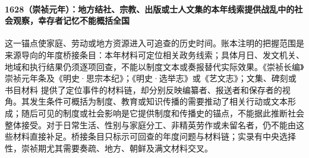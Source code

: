 \paragraph{1628（崇祯元年）：地方结社、宗教、出版或士人文集的本年线索提供战乱中的社会观察，幸存者记忆不能概括全国} 这一锚点使家庭、劳动或地方资源进入可追查的历史时间。账本注明的把握范围是来源导向的年度桥接条目：本年材料可定位相关政务线索；具体月日、发文机关、地域和执行结果仍须逐项回查，不能以制度文本或奏报替代实际效果。《崇祯长编》崇祯元年条及《明史·思宗本纪》；《明史·选举志》或《艺文志》；文集、碑刻或书目材料 提供了定位事件的材料链，却分别反映编纂者、报送者和保存者的视角。其发生条件可概括为制度、教育或知识传播的需要推动了相关行动或文本形成；随后可见的制度或社会影响是它提供制度和传播史的锚点，不能据此推断社会整体接受。对于日常生活、性别与家庭分工、非精英劳作或未留名者，仍不能由这些材料直接补足。桥接条目只标示可回查的年度问题与材料链；实录有中央选择性，崇祯期尤其需要奏疏、地方、朝鲜及满文材料交叉。
